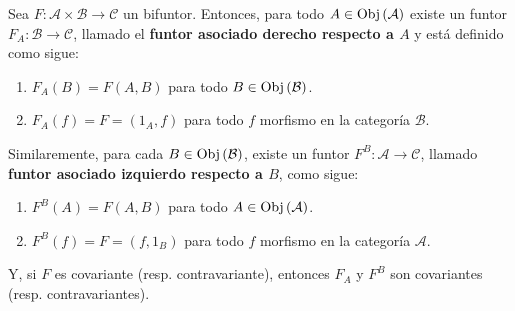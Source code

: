 \documentclass[12pt]{report}
\newcounter{it}
\theoremstyle{largebreak}
\newcommand\cf[3]{\ensuremath{#1:#2\rightarrow#3}}
\newcommand{\Obj}[1]{\ensuremath{\textup{Obj}\left(#1\right)}}
\begin{document}
    \begin{propo}
        Sea $\cf{F}{\mathcal{A}\times\mathcal{B}}{\mathcal{C}}$ un bifuntor. Entonces, para todo $A\in\Obj{\mathcal{A}}$ existe un funtor $\cf{F_A}{\mathcal{B}}{\mathcal{C}}$, llamado el \textbf{funtor asociado derecho respecto a $A$} y está definido como sigue:
        \begin{enumerate}
            \item $F_A(B)=F(A,B)$ para todo $B\in\Obj{\mathcal{B}}$.
            \item $F_A(f)=F=(1_A,f)$ para todo $f$ morfismo en la categoría $\mathcal{B}$.
        \end{enumerate}
        Similaremente, para cada $B\in\Obj{\mathcal{B}}$, existe un funtor $\cf{F^B}{\mathcal{A}}{\mathcal{C}}$, llamado \textbf{funtor asociado izquierdo respecto a $B$}, como sigue:
        \begin{enumerate}
            \item $F^B(A)=F(A,B)$ para todo $A\in\Obj{\mathcal{A}}$.
            \item $F^B(f)=F=(f,1_B)$ para todo $f$ morfismo en la categoría $\mathcal{A}$.
        \end{enumerate}
        Y, si $F$ es covariante (resp. contravariante), entonces $F_A$ y $F^B$ son covariantes (resp. contravariantes). 
    \end{propo}
\end{document}

